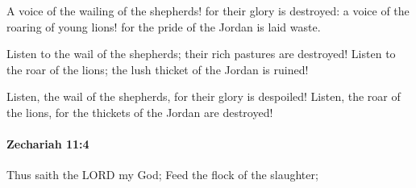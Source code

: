 			\begin{versebox}
					\item[BHS] 
					\item[LXX] 
					\item[ASV] A voice of the wailing of the shepherds! for their glory is destroyed: a voice of the roaring of young lions! for the pride of the Jordan is laid waste.
					\item[NIV] Listen to the wail of the shepherds; their rich pastures are destroyed! Listen to the roar of the lions; the lush thicket of the Jordan is ruined!
					\item[NRSV] Listen, the wail of the shepherds, for their glory is despoiled! Listen, the roar of the lions, for the thickets of the Jordan are destroyed!
			\end{versebox}

		\paragraph{Zechariah 11:4} %
			\label{ZECHARIAH-11-4}

			Thus saith the LORD my God; Feed the flock of the slaughter;

